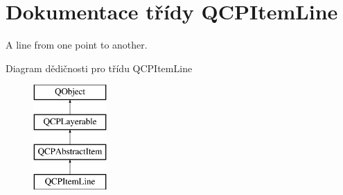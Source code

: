 \hypertarget{classQCPItemLine}{}\section{Dokumentace třídy Q\+C\+P\+Item\+Line}
\label{classQCPItemLine}


A line from one point to another.  


Diagram dědičnosti pro třídu Q\+C\+P\+Item\+Line\begin{figure}[H]
\begin{center}
\leavevmode
\includegraphics[height=4.000000cm]{classQCPItemLine}
\end{center}
\end{figure}
